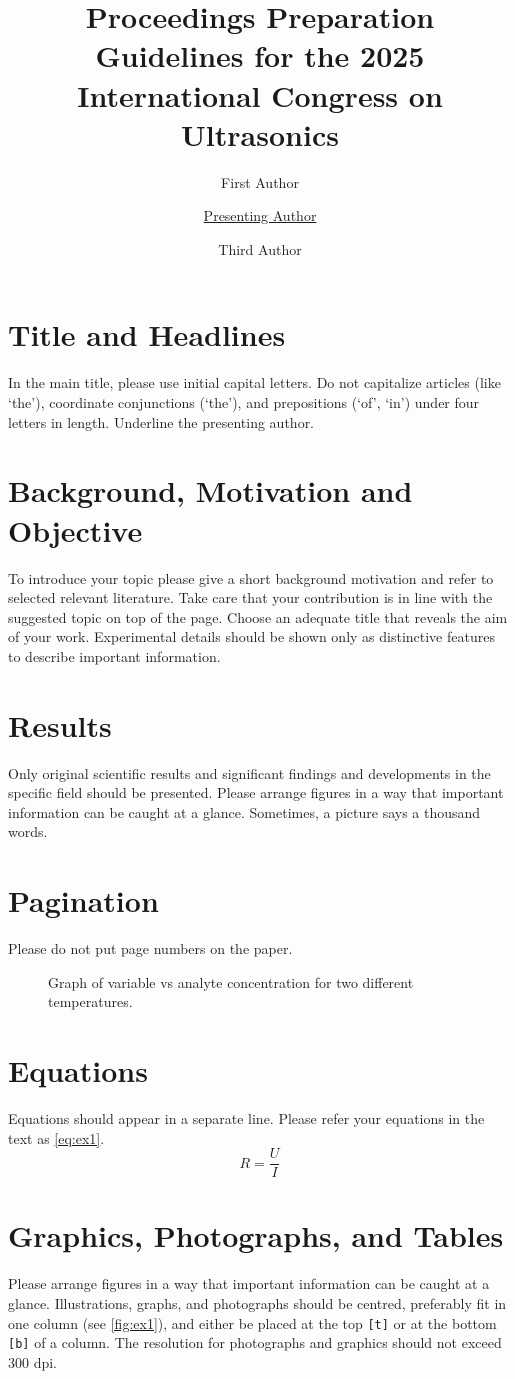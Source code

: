 \documentclass{ama}
\title{Proceedings Preparation Guidelines for the 2025 International Congress on Ultrasonics}
\author[1]{First Author}
\author[1]{\underline{Presenting Author}}
\author[2]{Third Author}
\affil[1]{Institution or company, address and country}
\affil[2]{Institution or company, address and country}
\begin{document}
\section{Title and Headlines}
In the main title, please use initial capital letters.
Do not capitalize articles (like `the'), coordinate conjunctions (`the'), and prepositions (`of', `in') under four letters in length.
Underline the presenting author.

\section{Background, Motivation and Objective}
To introduce your topic please give a short background motivation and refer to selected relevant literature.
Take care that your contribution is in line with the suggested topic on top of the page.
Choose an adequate title that reveals the aim of your work.
Experimental details should be shown only as distinctive features to describe important information.

\section{Results}
Only original scientific results and significant findings and developments in the specific field should be presented.
Please arrange figures in a way that important information can be caught at a glance.
Sometimes, a picture says a thousand words.

\section{Pagination}
Please do not put page numbers on the paper.
%
\begin{figure}
    \centering
    
    \caption{Graph of variable vs analyte concentration for two different temperatures.}\label{fig:ex1}
\end{figure}

\section{Equations}
Equations should appear in a separate line.
Please refer your equations in the text as \autoref{eq:ex1}.
\begin{equation}
    R = \frac{U}{I}\label{eq:ex1}
\end{equation}

\section{Graphics, Photographs, and Tables}
Please arrange figures in a way that important information can be caught at a glance.
Illustrations, graphs, and photographs should be centred, preferably fit in one column (see \autoref{fig:ex1}), and either be placed at the top \texttt{[t]} or at the bottom \texttt{[b]} of a column.
The resolution for photographs and graphics should not exceed 300 dpi.
\end{document}
